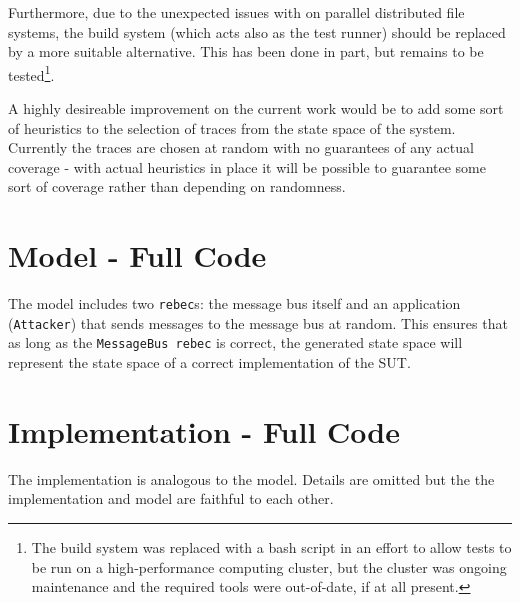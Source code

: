 \documentclass{article}
\begin{document}
		Furthermore, due to the unexpected issues with \citeauthor{sbt} on parallel distributed file systems, the build system (which acts also as the test runner) should be replaced by a more suitable alternative. This has been done in part, but remains to be tested\footnote{The build system was replaced with a bash script in an effort to allow tests to be run on a high-performance computing cluster, but the cluster was ongoing maintenance and the required tools were out-of-date, if at all present.}.

		A highly desireable improvement on the current work would be to add some sort of heuristics to the selection of traces from the state space of the system. Currently the traces are chosen at random with no guarantees of any actual coverage \-- with actual heuristics in place it will be possible to guarantee some sort of coverage rather than depending on randomness.



\newpage
\begin{appendices}

\section{\Rebeca Model - Full Code}



The \Rebeca model includes two \texttt{rebec}s: the message bus itself and an application (\texttt{Attacker}) that sends messages to the message bus at random. This ensures that as long as the \texttt{MessageBus rebec} is correct, the generated state space will represent the state space of a correct implementation of the SUT.

\newpage
\section{Implementation - Full Code}



The implementation is analogous to the \Rebeca model. Details are omitted but the the implementation and model are faithful to each other. 

%
%
%
%
%

\end{appendices}
\end{document}

